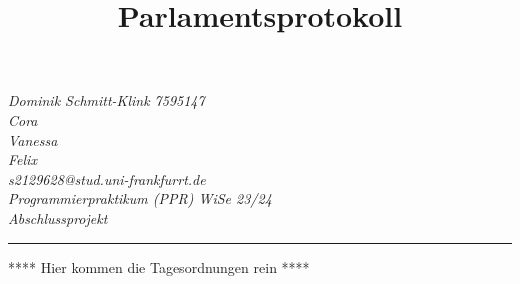 \documentclass[12pt]{scrartcl}
\begin{document}

    \begin{minipage}{0.9\textwidth}
        \emph{
            Dominik Schmitt-Klink 7595147\\
            Cora\\
            Vanessa\\
            Felix\\
            s2129628@stud.uni-frankfurrt.de\\
            Programmierpraktikum (PPR) WiSe 23/24\\
            Abschlussprojekt}

    \end{minipage}


    \begin{minipage}{0.9\textwidth}
        \title{Parlamentsprotokoll}
        \hrule
        \maketitle
    \end{minipage}

    \newpage

    \tableofcontents
    \newpage

    **** Hier kommen die Tagesordnungen rein ****
\end{document}
